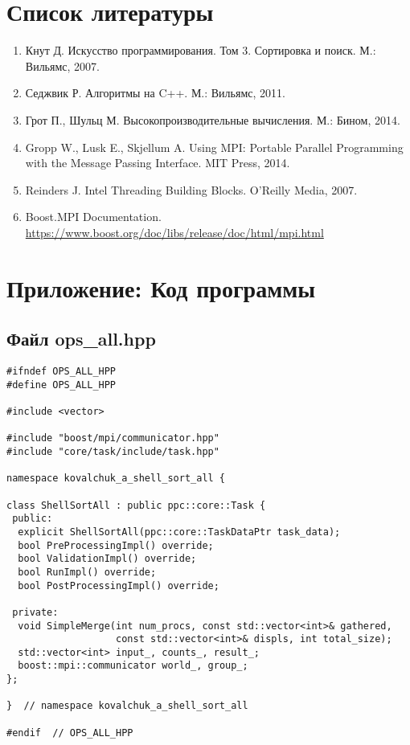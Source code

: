 \documentclass[a4paper,12pt]{article}
\begin{document}
\section*{Список литературы}
\begin{enumerate}
    \item Кнут Д. Искусство программирования. Том 3. Сортировка и поиск. М.: Вильямс, 2007.
    \item Седжвик Р. Алгоритмы на C++. М.: Вильямс, 2011.
    \item Грот П., Шульц М. Высокопроизводительные вычисления. М.: Бином, 2014.
    \item Gropp W., Lusk E., Skjellum A. Using MPI: Portable Parallel Programming with the Message Passing Interface. MIT Press, 2014.
    \item Reinders J. Intel Threading Building Blocks. O'Reilly Media, 2007.
    \item Boost.MPI Documentation. \url{https://www.boost.org/doc/libs/release/doc/html/mpi.html}
\end{enumerate}

\section*{Приложение: Код программы}

\subsection*{Файл ops\_all.hpp}
\begin{lstlisting}
#ifndef OPS_ALL_HPP
#define OPS_ALL_HPP

#include <vector>

#include "boost/mpi/communicator.hpp"
#include "core/task/include/task.hpp"

namespace kovalchuk_a_shell_sort_all {

class ShellSortAll : public ppc::core::Task {
 public:
  explicit ShellSortAll(ppc::core::TaskDataPtr task_data);
  bool PreProcessingImpl() override;
  bool ValidationImpl() override;
  bool RunImpl() override;
  bool PostProcessingImpl() override;

 private:
  void SimpleMerge(int num_procs, const std::vector<int>& gathered, 
                   const std::vector<int>& displs, int total_size);
  std::vector<int> input_, counts_, result_;
  boost::mpi::communicator world_, group_;
};

}  // namespace kovalchuk_a_shell_sort_all

#endif  // OPS_ALL_HPP
\end{lstlisting}
\end{document}
